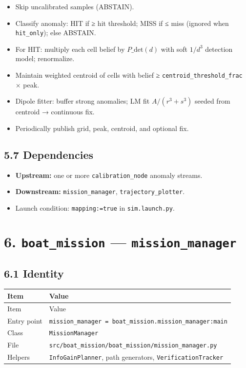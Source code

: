 \begin{itemize}[leftmargin=*]
\item Skip uncalibrated samples (ABSTAIN).
\item Classify anomaly: HIT if ≥ hit threshold; MISS if ≤ miss (ignored when \texttt{hit\_only}); else ABSTAIN.
\item For HIT: multiply each cell belief by \(P\_{\mathrm{det}}(d)\) with soft \(1/d^3\) detection model; renormalize.
\item Maintain weighted centroid of cells with belief ≥ \texttt{centroid\_threshold\_frac} × peak.
\item Dipole fitter: buffer strong anomalies; LM fit \(A/(r^3+s^3)\) seeded from centroid → continuous fix.
\item Periodically publish grid, peak, centroid, and optional fix.
\end{itemize}


\subsection{5.7 Dependencies}


\begin{itemize}[leftmargin=*]
\item \textbf{Upstream:} one or more \texttt{calibration\_node} anomaly streams.
\item \textbf{Downstream:} \texttt{mission\_manager}, \texttt{trajectory\_plotter}.
\item Launch condition: \texttt{mapping:=true} in \texttt{sim.launch.py}.
\end{itemize}




\section{6. \texttt{boat\_mission} --- \texttt{mission\_manager}}


\subsection{6.1 Identity}


\begin{center}
\small
\begin{longtable}{@{}lp{10cm}@{}}
\toprule
Item & Value \\
\midrule
\endfirsthead
\toprule
Item & Value \\
\midrule
\endhead
Entry point & \texttt{mission\_manager = boat\_mission.mission\_manager:main} \\
Class & \texttt{MissionManager} \\
File & \texttt{src/boat\_mission/boat\_mission/mission\_manager.py} \\
Helpers & \texttt{InfoGainPlanner}, path generators, \texttt{VerificationTracker} \\
\bottomrule
\end{longtable}
\end{center}


